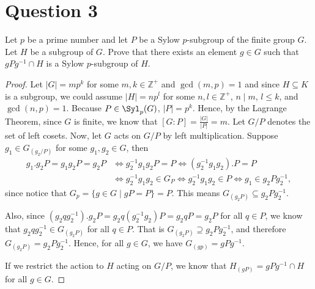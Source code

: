 \section{Question 3}

\begin{question}
    Let $p$ be a prime number and let $P$ be a Sylow $p$-subgroup of the finite group $G$. Let $H$ be a subgroup of $G$. Prove that there exists an element $g \in G$ such that $g P g^{-1} \cap H$ is a Sylow $p$-subgroup of $H$.
\end{question}

\begin{answer}
    \begin{proof}
        Let $\lvert G \rvert = mp^k$ for some $m,k \in \mathbb{Z}^+$ and $\gcd (m,p) = 1$ and since $H \subseteq K$ is a subgroup, we could assume $\lvert H \rvert = np^l$ for some $n,l \in \mathbb{Z}^+$, $n \mid m$, $l \leq k$, and $\gcd(n,p) = 1$. Because $P \in \Syl_p(G)$, $\lvert P \rvert = p^k$. Hence, by the Lagrange Theorem, since $G$ is finite, we know that $[G:P] = \tfrac{\lvert G \rvert}{\lvert P \rvert} = m$. Let $G/P$ denotes the set of left cosets. Now, let $G$ acts on $G/P$ by left multiplication. Suppose $g_1 \in G_{(g_2/P)}$ for some $g_1,g_2 \in G$, then 
        \begin{equation}
            \begin{aligned}
                g_1.g_2P = g_1g_2P = g_2P &\Leftrightarrow g_2^{-1}g_1g_2P = P \Leftrightarrow (g_2^{-1}g_1g_2).P = P\\
                &\Leftrightarrow g_2^{-1}g_1g_2 \in G_P \Leftrightarrow g_2^{-1}g_1g_2 \in P \Leftrightarrow g_1 \in g_2Pg_2^{-1},
            \end{aligned}
        \end{equation}
        since notice that $G_p = \{g \in G \mid gP = P\} = P$. This means $G_{(g_2P)} \subseteq g_2Pg_2^{-1}$.
        
        Also, since $(g_2qg_2^{-1}).g_2P = g_2q(g_2^{-1}g_2)P = g_2qP = g_2P$ for all $q \in P$, we know that $g_2qg_2^{-1} \in G_{(g_2P)}$ for all $q \in P$. That is $G_{(g_2P)} \supseteq g_2Pg_2^{-1}$, and therefore $G_{(g_2P)} =  g_2Pg_2^{-1}$. Hence, for all $g \in G$, we have $G_{(gp)} = gPg^{-1}$.
        
        If we restrict the action to $H$ acting on $G/P$, we know that $H_{(gP)} = gPg^{-1} \cap H$ for all $g \in G$.
        
        

\end{proof}
\end{answer}
